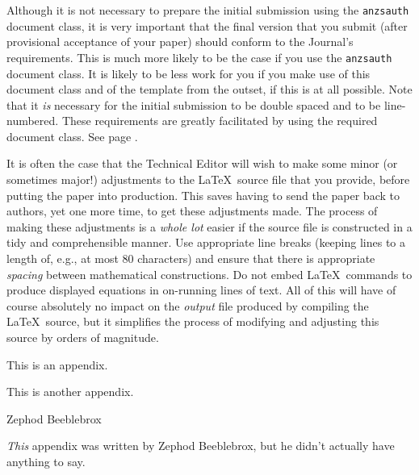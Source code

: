 \documentclass[times, doublespace]{anzsauth}
\begin{document}
Although it is not necessary to prepare the initial submission using
the \texttt{anzsauth} document class, it is very important that
the final version that you submit (after provisional acceptance of
your paper) should conform to the Journal's requirements.  This is
much more likely to be the case if you use the \texttt{anzsauth}
document class.  It is likely to be less work for you if you make
use of this document class and of the template from the outset,
if this is at all possible. Note that it \emph{is} necessary for
the initial submission to be double spaced and to be line-numbered.
These requirements are greatly facilitated by using the required
document class.  See page \pageref{pg:dsln}.

It is often the case that the Technical Editor will wish to make
some minor (or sometimes major!) adjustments to the \LaTeX\ source
file that you provide, before putting the paper into production.
This saves having to send the paper back to authors, yet one more
time, to get these adjustments made.  The process of making these
adjustments is a \emph{whole lot} easier if the source file is
constructed in a tidy and comprehensible manner.  Use appropriate
line breaks (keeping lines to a length of, e.g., at most 80
characters) and ensure that there is appropriate \emph{spacing}
between mathematical constructions.  Do not embed \LaTeX\ commands
to produce displayed equations in on-running lines of text.  All of
this will have of course absolutely no impact on the \emph{output}
file produced by compiling the \LaTeX\ source, but it simplifies
the process of modifying and adjusting this source by orders of
magnitude.

\begin{Appendix}
\label{app:mung}

This is an appendix. \lipsum[1]

\end{Appendix}

\begin{Appendix}
\label{app:gorp}

This is another appendix. \lipsum[2]

\end{Appendix}

\begin{Appendix}
\label{app:zephod}
\begin{center}
Zephod Beeblebrox
\end{center}

\emph{This} appendix was written by Zephod Beeblebrox, but he didn't
actually have anything to say. \lipsum[3]
\end{Appendix}
\end{document}
